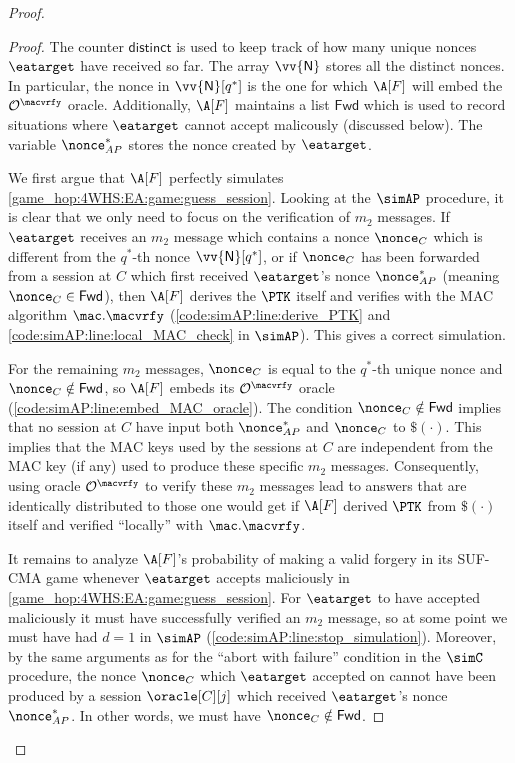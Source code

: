 \begin{proof}
\begin{proof}
The counter $\mathsf{distinct}$ is used to keep track of how many unique nonces $\eatarget$ have received so far.
The array $\vv{\mathsf{N}}$ stores all the distinct nonces. 
In particular,
the nonce in $\vv{\mathsf{N}}[q^*]$ is the one for which $\A[F]$ will embed the $\mathcal{O}^{\macvrfy}$  oracle.
Additionally,
$\A[F]$ maintains a list $\mathsf{Fwd}$ which is used to record situations where $\eatarget$ cannot accept malicously
(discussed below).
The variable $\nonce_{AP}^*$ stores the nonce created by $\eatarget$.

We first argue that $\A[F]$ perfectly simulates \cref{game_hop:4WHS:EA:game:guess_session}.
Looking at the $\simAP$ procedure,
it is clear that we only need to focus on the verification of $m_2$ messages.
If $\eatarget$ receives an $m_2$ message which contains a nonce $\nonce_{C}$ which is different from the $q^*$-th nonce $\vv{\mathsf{N}}[q^*]$,
or if $\nonce_{C}$ has been forwarded from a session at $C$ which first received $\eatarget$'s nonce $\nonce_{AP}^*$
(meaning $\nonce_{C} \in  \mathsf{Fwd}$),
then $\A[F]$ derives the $\PTK$ itself and verifies with the MAC algorithm $\mac.\macvrfy$ 
(\cref{code:simAP:line:derive_PTK} and \cref{code:simAP:line:local_MAC_check} in $\simAP$).
This gives a correct simulation.


For the remaining $m_2$ messages,
$\nonce_{C}$ is equal to the $q^*$-th unique nonce and $\nonce_{C} \notin \mathsf{Fwd}$,
so $\A[F]$ embeds its $\mathcal{O}^{\macvrfy}$ oracle
(\cref{code:simAP:line:embed_MAC_oracle}).
The condition $\nonce_{C} \notin \mathsf{Fwd}$ implies that no session at $C$ have input both $\nonce_{AP}^*$ and $\nonce_{C}$ to $\$(\cdot)$.
This implies that the MAC keys used by the sessions at $C$ are independent from the MAC key
(if any) used to produce these specific $m_2$ messages.
Consequently,
using oracle $\mathcal{O}^{\macvrfy}$ to verify these $m_2$ messages lead to  answers that are identically distributed to those one would get if $\A[F]$ derived $\PTK$ from $\$(\cdot)$ itself and verified ``locally'' with $\mac.\macvrfy$.

It remains to analyze $\A[F]$'s probability of  making a valid forgery in its SUF-CMA game whenever $\eatarget$ accepts maliciously in \cref{game_hop:4WHS:EA:game:guess_session}.
For $\eatarget$ to have accepted maliciously it must have successfully verified an $m_2$ message,
so at some point we must have had $d = 1$ in $\simAP$
(\cref{code:simAP:line:stop_simulation}).
Moreover,
by the same arguments as for the ``abort with failure'' condition in the $\simC$ procedure,
the nonce $\nonce_{C}$ which $\eatarget$ accepted on cannot have been produced by a session $\oracle[C][j]$ which received $\eatarget$'s nonce $\nonce_{AP}^*$.
In other words,
we must have $\nonce_{C} \notin \mathsf{Fwd}$.


\end{proof}
\end{proof}
